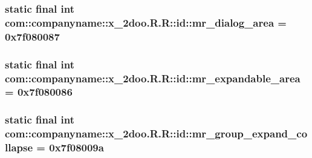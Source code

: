 \hypertarget{classcom_1_1companyname_1_1x__2doo_1_1_r_1_1id_2a82c904a336bbe4bc9abccaca153d74}{
\subsubsection[{mr\_\-dialog\_\-area}]{\setlength{\rightskip}{0pt plus 5cm}static final int com::companyname::x\_\-2doo.R.R::id::mr\_\-dialog\_\-area = 0x7f080087}}
\label{classcom_1_1companyname_1_1x__2doo_1_1_r_1_1id_2a82c904a336bbe4bc9abccaca153d74}


\hypertarget{classcom_1_1companyname_1_1x__2doo_1_1_r_1_1id_b6f5e32f4b0cab6219ead333cd1ad04a}{
\subsubsection[{mr\_\-expandable\_\-area}]{\setlength{\rightskip}{0pt plus 5cm}static final int com::companyname::x\_\-2doo.R.R::id::mr\_\-expandable\_\-area = 0x7f080086}}
\label{classcom_1_1companyname_1_1x__2doo_1_1_r_1_1id_b6f5e32f4b0cab6219ead333cd1ad04a}


\hypertarget{classcom_1_1companyname_1_1x__2doo_1_1_r_1_1id_3b8ecfa7c3fa0ea6e7505ac3fbc99b04}{
\subsubsection[{mr\_\-group\_\-expand\_\-collapse}]{\setlength{\rightskip}{0pt plus 5cm}static final int com::companyname::x\_\-2doo.R.R::id::mr\_\-group\_\-expand\_\-collapse = 0x7f08009a}}
\label{classcom_1_1companyname_1_1x__2doo_1_1_r_1_1id_3b8ecfa7c3fa0ea6e7505ac3fbc99b04}


